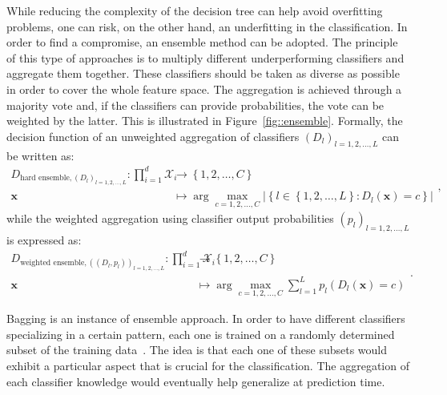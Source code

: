                 While reducing the complexity of the decision tree can help avoid overfitting problems, one can risk, on the other hand, an underfitting in the classification.
                In order to find a compromise, an ensemble method can be adopted.
                The principle of this type of approaches is to multiply different underperforming classifiers and aggregate them together.
                These classifiers should be taken as diverse as possible in order to cover the whole feature space.
                The aggregation is achieved through a majority vote and, if the classifiers can provide probabilities, the vote can be weighted by the latter.
                This is illustrated in Figure~\ref{fig::ensemble}.
                Formally, the decision function of an unweighted aggregation of classifiers $\left(D_l\right)_{l=1,2,\dots,L}$ can be written as:
                \begin{equation}
                    \label{eq::decision_function_hard_ensemble}
                    \begin{aligned}
                        D_{\text{hard ensemble}, \left(D_l\right)_{l=1,2,\dots,L}}: \prod_{i=1}^{d}\mathscr{X}_i &\rightarrow \left\{1,2,\dots,C\right\}\\
                        \bm{x} &\mapsto \arg \max_{c=1,2,\dots,C}\lvert\left\{l\in\left\{1,2,\dots,L\right\}: D_l(\bm{x}) = c\right\}\rvert
                    \end{aligned},
                \end{equation}
                while the weighted aggregation using classifier output probabilities $\left(p_l\right)_{l=1,2,\dots,L}$ is expressed as:
                \begin{equation}
                    \label{eq::decision_function_weighted_ensemble}
                    \begin{aligned}
                        D_{\text{weighted ensemble}, \left((D_l, p_l)\right)_{l=1,2,\dots,L}}: \prod_{i=1}^{d}\mathscr{X}_i &\rightarrow \left\{1,2,\dots,C\right\}\\
                        \bm{x} &\mapsto \arg \max_{c=1,2,\dots,C} \sum_{l=1}^{L} p_l\left(D_l(\bm{x}) = c\right) 
                    \end{aligned}.
                \end{equation}

                Bagging is an instance of ensemble approach.
                In order to have different classifiers specializing in a certain pattern, each one is trained on a randomly determined subset of the training data~\parencite{breiman1996bagging}.
                The idea is that each one of these subsets would exhibit a particular aspect that is crucial for the classification.
                The aggregation of each classifier knowledge would eventually help generalize at prediction time.\\

